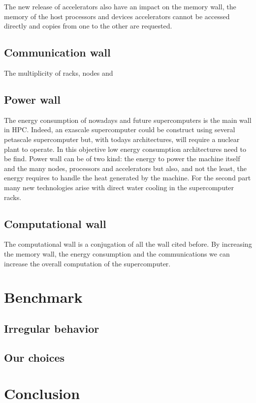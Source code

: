 The new release of accelerators also have an impact on the memory wall, the memory of the host processors and devices accelerators cannot be accessed directly and copies from one to the other are requested.

\subsection{Communication wall} 
The multiplicity of racks, nodes and 

\subsection{Power wall}
The energy consumption of nowadays and future supercomputers is the main wall in HPC. 
Indeed, an exascale supercomputer could be construct using several petascale supercomputer but, with todays architectures, will require a nuclear plant to operate. 
In this objective low energy consumption architectures need to be find. 
Power wall can be of two kind: the energy to power the machine itself and the many nodes, processors and accelerators but also, and not the least, the energy requires to handle the heat generated by the machine. 
For the second part many new technologies arise with direct water cooling in the supercomputer racks.

\subsection{Computational wall}
The computational wall is a conjugation of all the wall cited before. 
By increasing the memory wall, the energy consumption and the communications we can increase the overall computation of the supercomputer. 

\section{Benchmark}

\subsection{Irregular behavior}

\subsection{Our choices}


\section{Conclusion}